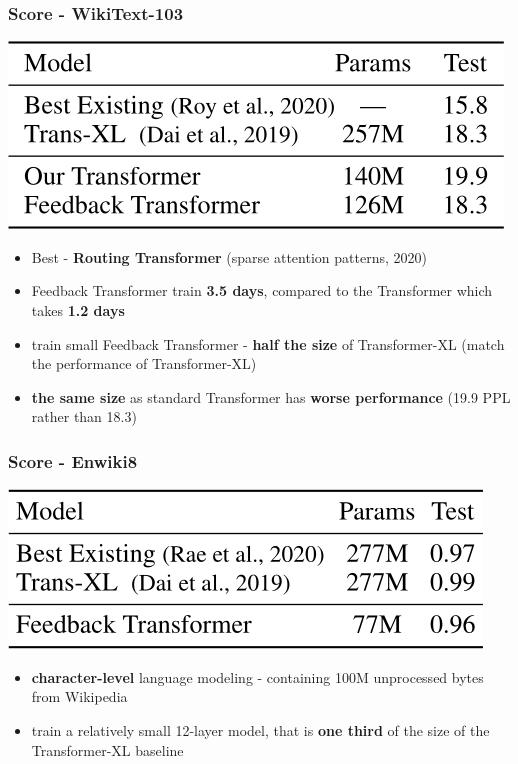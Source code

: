 \documentclass{beamer}
\begin{document}
\begin{frame}
    \frametitle{Score - WikiText-103}
    \begin{center}
        \includegraphics[scale=0.3]{img/feedback_transformer_wikitext103.png}
    \end{center}
    \begin{itemize}
        \item Best - \textbf{Routing Transformer} (sparse attention patterns, 2020)
        \item Feedback Transformer train \textbf{3.5 days}, compared to the Transformer which takes \textbf{1.2 days}
        \item train small Feedback Transformer - \textbf{half the size} of Transformer-XL (match the performance of Transformer-XL)
        \item \textbf{the same size} as standard Transformer has \textbf{worse performance} (19.9 PPL rather than 18.3)
    \end{itemize}
\end{frame}

\begin{frame}
    \frametitle{Score - Enwiki8}
    \begin{center}
        \includegraphics[scale=0.3]{img/feedback_transformer_enwiki8.png}
    \end{center}
    \begin{itemize}
        \item \textbf{character-level} language modeling - containing 100M unprocessed bytes from Wikipedia
        \item train a relatively small 12-layer model, that is \textbf{one third} of the size of the Transformer-XL baseline
    \end{itemize}
\end{frame}
\end{document}
